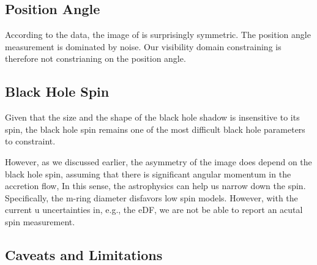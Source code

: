 \subsection{Position Angle}


According to the data, the image of \sgra is surprisingly symmetric.
The position angle measurement is dominated by noise.
Our visibility domain constraining is therefore not constrianing on
the position angle.

\subsection{Black Hole Spin}


Given that the size and the shape of the black hole shadow is
insensitive to its spin, the black hole spin remains one of the most
difficult black hole parameters to constraint.

However, as we discussed earlier, the asymmetry of the image does
depend on the black hole spin, assuming that there is significant
angular momentum in the accretion flow, In this sense, the
astrophysics can help us narrow down the spin.
Specifically, the m-ring diameter disfavors low spin models.
However, with the current u uncertainties in, e.g., the eDF, we are
not be able to report an acutal spin measurement.


\subsection{Caveats and Limitations}\label{sec:limits}




